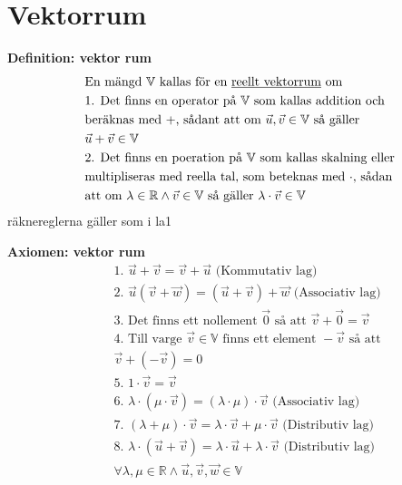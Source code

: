 \section{Vektorrum}
\textbf{Definition: vektor rum}
\begin{align*}
  &\quad  \text{En mängd $\mathbb{V}$ kallas för en \underline{reellt vektorrum} om } \\
  &\quad  \text{1. Det finns en operator på  $\mathbb{V}$ som kallas addition och} \\
  &\quad  \text{beräknas med $+$, sådant att om } \vec{u},\vec{v} \in \mathbb{V} \text{ så gäller}  \\
  &\quad  \vec{u}+\vec{v}\in\mathbb{V} \\
  &\quad  \text{2. Det finns en poeration på  $\mathbb{V}$ som kallas skalning eller } \\
  &\quad  \text{multipliseras med reella tal, som beteknas med $\cdot$, sådan } \\
  &\quad  \text{att om } \lambda\in\mathbb{R} \land \vec{v}\in\mathbb{V} \text{ så gäller }
  \lambda\cdot\vec{v}\in\mathbb{V}
\end{align*}
räknereglerna gäller som i la1

\textbf{Axiomen: vektor rum}
\begin{align*}
  &\quad  \text{1. } \vec{u}+\vec{v} = \vec{v}+\vec{u} \text{ (Kommutativ lag)} \\
  &\quad  \text{2. } \vec{u}(\vec{v}+\vec{w}) = (\vec{u}+\vec{v})+\vec{w} \text{ (Associativ lag)} \\
  &\quad  \text{3. } \text{Det finns ett nollement } \vec{0} \text{ så att }
  \vec{v}+\vec{0}=\vec{v} \\
  &\quad  \text{4. } \text{Till varge } \vec{v}\in\mathbb{V} \text{ finns ett element }
  -\vec{v} \text{ så att} \\
  &\quad  \vec{v}+(-\vec{v}) = 0 \\
  &\quad  \text{5. } 1\cdot\vec{v} = \vec{v} \\
  &\quad  \text{6. } \lambda\cdot(\mu\cdot\vec{v}) = (\lambda\cdot\mu)\cdot\vec{v}
  \text{ (Associativ lag)} \\
  &\quad  \text{7. } (\lambda+\mu)\cdot\vec{v} = \lambda\cdot\vec{v} + \mu\cdot\vec{v}
  \text{ (Distributiv lag)} \\
  &\quad  \text{8. } \lambda\cdot(\vec{u}+\vec{v}) = \lambda\cdot\vec{u} + \lambda\cdot\vec{v}
  \text{ (Distributiv lag)} \\
  &\quad  \forall\lambda,\mu\in\mathbb{R}\land\vec{u},\vec{v},\vec{w}\in\mathbb{V} \\
\end{align*}


